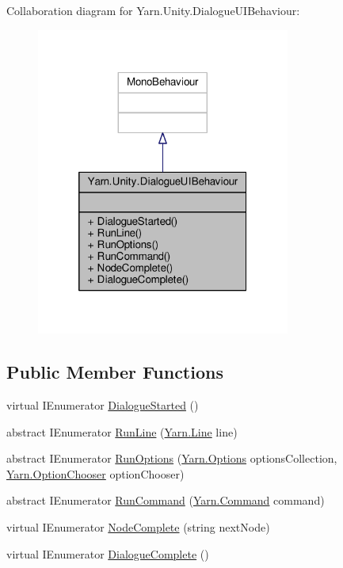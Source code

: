 Collaboration diagram for Yarn.\-Unity.\-Dialogue\-U\-I\-Behaviour\-:
\nopagebreak
\begin{figure}[H]
\begin{center}
\leavevmode
\includegraphics[width=236pt]{d4/dce/a00337}
\end{center}
\end{figure}
\subsection*{Public Member Functions}
\begin{DoxyCompactItemize}
\item 
virtual I\-Enumerator \hyperlink{a00038_af9d88ca81ac536d43046ca6572e3ff54}{Dialogue\-Started} ()
\item 
abstract I\-Enumerator \hyperlink{a00038_a754c6dd0bc67895d11f878fe4477d698}{Run\-Line} (\hyperlink{a00026_db/d44/a00162}{Yarn.\-Line} line)
\item 
abstract I\-Enumerator \hyperlink{a00038_ac5b29079f638f2ceb078627ef1e60004}{Run\-Options} (\hyperlink{a00026_db/ddf/a00164}{Yarn.\-Options} options\-Collection, \hyperlink{a00026_a39866cbb03c03a35805d598b5d4ad553}{Yarn.\-Option\-Chooser} option\-Chooser)
\item 
abstract I\-Enumerator \hyperlink{a00038_a3dffe84b9e7a10fdec6749baf697d111}{Run\-Command} (\hyperlink{a00026_de/db9/a00159}{Yarn.\-Command} command)
\item 
virtual I\-Enumerator \hyperlink{a00038_a2900548a0704d39d4502a153945f4bef}{Node\-Complete} (string next\-Node)
\item 
virtual I\-Enumerator \hyperlink{a00038_aecc60aee9e9386da1f71fb183f43c52d}{Dialogue\-Complete} ()
\end{DoxyCompactItemize}



